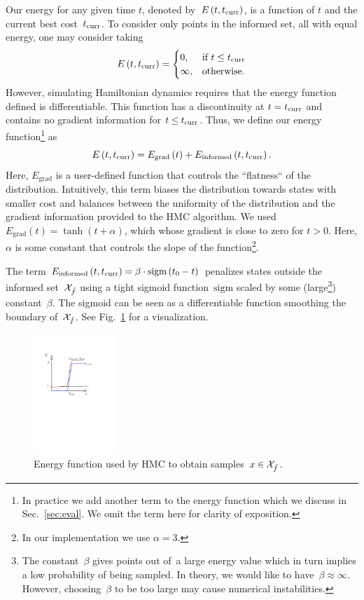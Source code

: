 \documentclass[letterpaper, 10 pt, conference]{ieeeconf}  %
\begin{document}
Our energy for any given time $t$, 
denoted by~$E\left(t,t_{\rm{curr}} \right)$, 
is a function of $t$ and the current best cost~$t_{\rm{curr}}$.
To consider only points in the informed set, all with equal energy, one may consider taking 
$$
E\left(t,t_{\rm{curr}} \right) = 
\begin{cases}
    0,	& \text{if } t \leq t_{\rm{curr}}\\        
    \infty,  	& \text{otherwise}.
\end{cases}
$$
However, simulating Hamiltonian dynamics requires that the energy function defined is differentiable.
This function has a discontinuity at $t = t_{\rm{curr}}$ 
and contains no gradient information for $t \leq t_{\rm{curr}}$.
Thus, we define our energy function\footnote{In practice we add another term to the energy function which we discuss in Sec.~\ref{sec:eval}. We omit the term here for clarity of exposition.} as  
\begin{equation}
\label{eq:energy}
E\left( t, t_{\rm{curr}} \right) 
= 
E_{\text{grad}} \left( t \right) + 
E_{\text{informed}} \left( t,t_{\rm{curr}} \right).
\end{equation}
Here, $E_{\text{grad}}$ is a user-defined function that
controls the ``flatness`` of the distribution.
Intuitively, this term biases the distribution towards states with smaller cost and balances between the uniformity of the distribution and the gradient information provided to the HMC algorithm.
We used $E_{\text{grad}} (t) = \tanh(t + \alpha )$,  which whose gradient is close to zero for $t>0$.
Here, $\alpha$ is some constant that controls the slope of the function\footnote{In our implementation we use $\alpha=3$.}.

The term 
$E_{\text{informed}} \left( t,t_{\rm{curr}} \right) 
= \beta \cdot \text{sigm}\left(t_0 - t\right)
$
penalizes states outside the informed set~$\mathcal{X}_{\hat{f}}$ using a tight sigmoid function~$\text{sigm}$ scaled by some (large\footnote{The constant~$\beta$ gives points out of~\Cinf a large energy value which in turn implies a low probability of being sampled. In theory, we would like to have~$\beta \approx \infty$. However, choosing~$\beta$ to be too large may cause numerical instabilities.}) constant~$\beta$.
The sigmoid can be seen as a differentiable function smoothing the boundary of~$\mathcal{X}_{\hat{f}}$.
See Fig.~\ref{fig:energy} for a visualization.

\begin{figure}[tb]
  \centering
  	\includegraphics[height = 4.5cm ]{fig/energy.pdf}
  \caption{
    \captionstyle
  	Energy function used by HMC to obtain samples~$x \in \mathcal{X}_{\hat{f}}$.
  	}
   	\label{fig:energy}
\end{figure}
\end{document}
